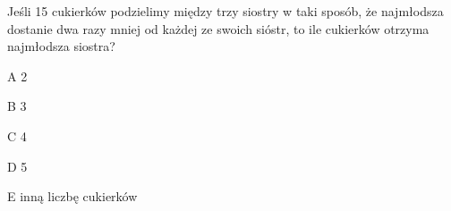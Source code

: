 \begin{tresc}
Jeśli 15 cukierków podzielimy między trzy siostry w taki sposób, że najmłodsza dostanie dwa razy mniej od każdej ze swoich sióstr, to ile cukierków otrzyma najmłodsza siostra?
\end{tresc}
\begin{wariant}{A} 2 \end{wariant}
\begin{wariant}{B} 3 \end{wariant}
\begin{wariant}{C} 4 \end{wariant}
\begin{wariant}{D} 5 \end{wariant}
\begin{wariant}{E} inną liczbę cukierków \end{wariant}
